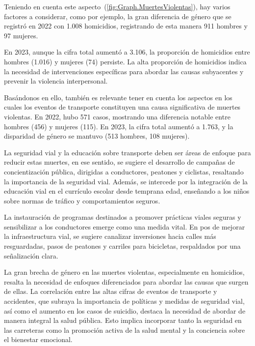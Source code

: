 \documentclass[letterpaper, 12pt]{article}
\begin{document}
Teniendo en cuenta este
aspecto~(\ref{fig:Graph.MuertesViolentas}), hay varios
factores a considerar, como por ejemplo, la gran diferencia
de género que se registró en 2022 con 1.008 homicidios,
registrando de esta manera 911 hombres y 97 mujeres.

En 2023, aunque la cifra total aumentó a 3.106, la
proporción de homicidios entre hombres (1.016) y mujeres
(74) persiste. La alta proporción de homicidios indica la
necesidad de intervenciones específicas para abordar las
causas subyacentes y prevenir la violencia interpersonal.

Basándonos en ello, también es relevante tener en cuenta
los aspectos en los cuales los eventos de transporte
constituyen una causa significativa de muertes violentas.
En 2022, hubo 571 casos, mostrando una diferencia notable
entre hombres (456) y mujeres (115). En 2023, la cifra
total aumentó a 1.763, y la disparidad de género se mantuvo
(513 hombres, 108 mujeres).

La seguridad vial y la educación sobre transporte deben ser
áreas de enfoque para reducir estas muertes, en ese
sentido, se sugiere el desarrollo de campañas de
concientización pública, dirigidas a conductores, peatones
y ciclistas, resaltando la importancia de la seguridad
vial. Además, se intercede por la integración de la
educación vial en el currículo escolar desde temprana edad,
enseñando a los niños sobre normas de tráfico y
comportamientos seguros.

La instauración de programas destinados a promover
prácticas viales seguras y sensibilizar a los conductores
emerge como una medida vital. En pos de mejorar la
infraestructura vial, se sugiere canalizar inversiones
hacia calles más resguardadas, pasos de peatones y carriles
para bicicletas, respaldados por una señalización clara.

La gran brecha de género en las muertes violentas,
especialmente en homicidios, resalta la necesidad de
enfoques diferenciados para abordar las causas que surgen
de ellas. La correlación entre las altas cifras de eventos
de transporte y accidentes, que subraya la importancia de
políticas y medidas de seguridad vial, así como el aumento
en los casos de suicidio, destaca la necesidad de abordar
de manera integral la salud pública. Esto implica
incorporar tanto la seguridad en las carreteras como la
promoción activa de la salud mental y la conciencia sobre
el bienestar emocional.

\end{document}
